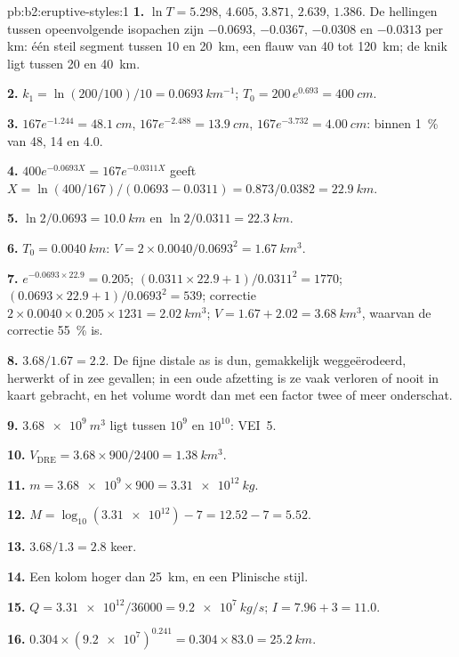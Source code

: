 \begin{solution}{pb:b2:eruptive-styles:1}
\textbf{1.} $\ln T = 5.298$, $4.605$, $3.871$, $2.639$, $1.386$. De hellingen tussen
opeenvolgende isopachen zijn $-0.0693$, $-0.0367$, $-0.0308$ en $-0.0313$ per km: één
steil segment tussen 10 en \qty{20}{km}, een flauw van 40 tot
\qty{120}{km}; de knik ligt tussen 20 en \qty{40}{km}.

\textbf{2.} $k_1 = \ln(200/100)/10 = \qty{0.0693}{km^{-1}}$; $T_0 = 200\,e^{0.693} =
\qty{400}{cm}$.

\textbf{3.} $167e^{-1.244} = \qty{48.1}{cm}$, $167e^{-2.488} = \qty{13.9}{cm}$,
$167e^{-3.732} = \qty{4.00}{cm}$: binnen \qty{1}{\percent} van 48, 14 en 4.0.

\textbf{4.} $400e^{-0.0693X} = 167e^{-0.0311X}$ geeft $X = \ln(400/167)/(0.0693 -
0.0311) = 0.873/0.0382 = \qty{22.9}{km}$.

\textbf{5.} $\ln2/0.0693 = \qty{10.0}{km}$ en $\ln2/0.0311 = \qty{22.3}{km}$.

\textbf{6.} $T_0 = \qty{0.0040}{km}$: $V = 2\times0.0040/0.0693^2 =
\qty{1.67}{km^3}$.

\textbf{7.} $e^{-0.0693\times22.9} = 0.205$; $(0.0311\times22.9 + 1)/0.0311^2 = 1770$;
$(0.0693\times22.9 + 1)/0.0693^2 = 539$; correctie $2\times0.0040\times0.205\times1231 =
\qty{2.02}{km^3}$; $V = 1.67 + 2.02 = \qty{3.68}{km^3}$, waarvan de correctie
\qty{55}{\percent} is.

\textbf{8.} $3.68/1.67 = 2.2$. De fijne distale as is dun, gemakkelijk weggeërodeerd,
herwerkt of in zee gevallen; in een oude afzetting is ze vaak verloren of nooit in kaart
gebracht, en het volume wordt dan met een factor twee of meer onderschat.

\textbf{9.} $\qty{3.68e9}{m^3}$ ligt tussen $10^9$ en $10^{10}$: VEI~5.

\textbf{10.} $V_{\mathrm{DRE}} = 3.68\times900/2400 = \qty{1.38}{km^3}$.

\textbf{11.} $m = \num{3.68e9}\times900 = \qty{3.31e12}{kg}$.

\textbf{12.} $M = \log_{10}(\num{3.31e12}) - 7 = 12.52 - 7 = 5.52$.

\textbf{13.} $3.68/1.3 = 2.8$ keer.

\textbf{14.} Een kolom hoger dan \qty{25}{km}, en een Plinische stijl.

\textbf{15.} $Q = \num{3.31e12}/36000 = \qty{9.2e7}{kg/s}$; $I = 7.96 + 3 = 11.0$.

\textbf{16.} $0.304\times(\num{9.2e7})^{0.241} = 0.304\times83.0 = \qty{25.2}{km}$.


\end{solution}
